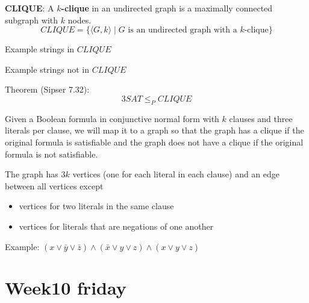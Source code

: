 \documentclass[12pt, oneside]{article}
\begin{document}
\vfill
\vfill


\newpage

{\bf CLIQUE}: A {\bf $k$-clique} in an undirected graph is a maximally connected subgraph with $k$  nodes.
\[
CLIQUE  = \{  \langle G, k \rangle \mid \text{$G$ is an  undirected graph with  a $k$-clique} \}
\]


Example strings  in $CLIQUE$

\vfill

Example  strings not  in $CLIQUE$

\vfill

Theorem (Sipser 7.32):
\[
3SAT  \leq_P CLIQUE
\]

Given a Boolean formula in conjunctive normal form with $k$ clauses and three literals per clause, we will 
map it to a graph so that the graph has a clique if the original formula is satisfiable and the 
graph does not have a clique if the original formula is not satisfiable.

The graph has $3k$ vertices (one for each literal in each clause) and an edge between all vertices except
\begin{itemize}
    \item vertices for two literals in the same clause
    \item vertices for literals that are negations of one another
\end{itemize}

Example: $(x \vee \bar{y} \vee {\bar z}) \wedge (\bar{x}  \vee y  \vee  z) \wedge (x \vee y  \vee z)$

\vfill

\newpage
 \vfill
\section*{Week10 friday}
\end{document}
